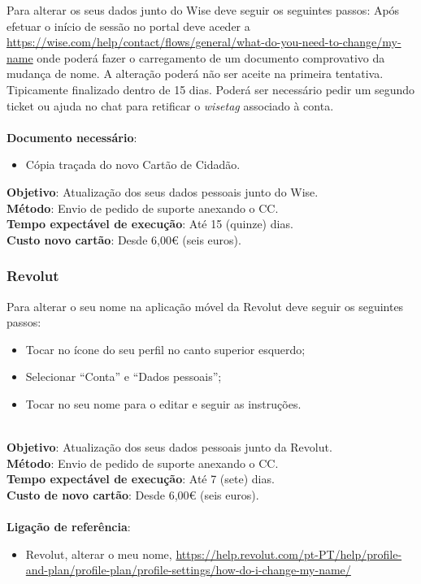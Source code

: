Para alterar os seus dados junto do Wise deve seguir os seguintes
passos: Após efetuar o início de sessão no portal deve aceder a
\url{https://wise.com/help/contact/flows/general/what-do-you-need-to-change/my-name}
onde poderá fazer o carregamento de um documento comprovativo da mudança
de nome. A alteração poderá não ser aceite na primeira tentativa.
Tipicamente finalizado dentro de 15 dias. Poderá ser necessário pedir um
segundo ticket ou ajuda no chat para retificar o \emph{wisetag}
associado à conta. \\
\\
\textbf{Documento necessário}:
\begin{itemize}
	\item Cópia traçada do novo Cartão de Cidadão.
\end{itemize}
\textbf{Objetivo}: Atualização dos seus dados pessoais junto do Wise. \\
\textbf{Método}: Envio de pedido de suporte anexando o CC. \\
\textbf{Tempo expectável de execução}: Até 15 (quinze) dias. \\
\textbf{Custo novo cartão}: Desde 6,00€ (seis euros).

\subsubsection{Revolut}

Para alterar o seu nome na aplicação móvel da Revolut deve seguir os
seguintes passos: \\
\begin{itemize}
	\item Tocar no ícone do seu perfil no canto superior esquerdo;
	\item Selecionar ``Conta'' e ``Dados pessoais'';
	\item Tocar no seu nome para o editar e seguir as instruções.
\end{itemize}
\leavevmode\\
\textbf{Objetivo}: Atualização dos seus dados pessoais junto da Revolut. \\
\textbf{Método}: Envio de pedido de suporte anexando o CC. \\
\textbf{Tempo expectável de execução}: Até 7 (sete) dias. \\
\textbf{Custo de novo cartão}: Desde 6,00€ (seis euros).\\
\\
\textbf{Ligação de referência}:
\begin{itemize}
	\item Revolut, alterar o meu nome, \url{https://help.revolut.com/pt-PT/help/profile-and-plan/profile-plan/profile-settings/how-do-i-change-my-name/}
\end{itemize}

